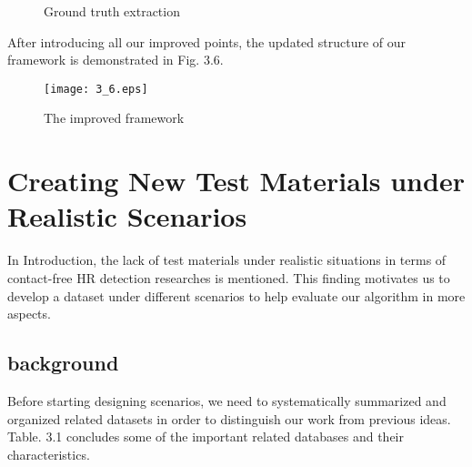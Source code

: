 \begin{figure}[ht]
\hspace{-0.5in}
\caption{Ground truth extraction}\label{fig:noted-figure}
\end{figure}

After introducing all our improved points, the updated structure of our framework is demonstrated in Fig. 3.6.

\begin{figure}[ht]
\centering
\texttt{[image: 3\_6.eps]}
\caption{The improved framework}\label{fig:noted-figure}
\end{figure}


\section{Creating New Test Materials under Realistic Scenarios}
In Introduction, the lack of test materials under realistic situations in terms of contact-free HR detection researches is mentioned. This finding motivates us to develop a dataset under different scenarios to help evaluate our algorithm in more aspects. 

\subsection{background}
Before starting designing scenarios, we need to systematically summarized and organized related datasets in order to distinguish our work from previous ideas. Table. 3.1 concludes some of the important related databases and their characteristics.

